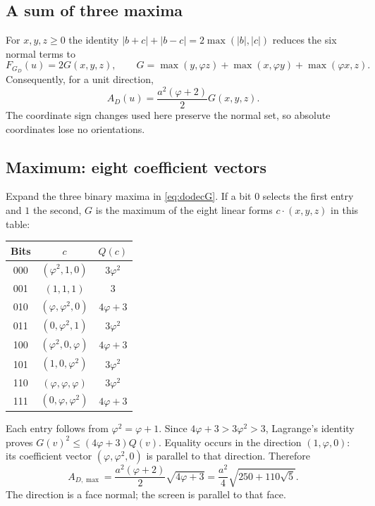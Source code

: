 \documentclass[11pt,a4paper]{article}
\newcommand{\ph}{\varphi}
\newcommand{\abs}[1]{\left|#1\right|}
\begin{document}
\subsection{A sum of three maxima}
For $x,y,z\ge0$ the identity $\abs{b+c}+\abs{b-c}=2\max(\abs b,\abs c)$ reduces the six normal terms to
\begin{equation}\label{eq:dodecG}
 F_{G_D}(u)=2G(x,y,z),\qquad
 G=\max(y,\ph z)+\max(x,\ph y)+\max(\ph x,z).
\end{equation}
Consequently, for a unit direction,
\begin{equation}\label{eq:dodecarea}
 A_D(u)=\frac{a^2(\ph+2)}2G(x,y,z).
\end{equation}
The coordinate sign changes used here preserve the normal set, so absolute coordinates lose no orientations.

\subsection{Maximum: eight coefficient vectors}
Expand the three binary maxima in \eqref{eq:dodecG}. If a bit $0$ selects the first entry and $1$ the second, $G$ is the maximum of the eight linear forms $c\cdot(x,y,z)$ in this table:
\begin{center}
\renewcommand{\arraystretch}{1.2}
\begin{tabular}{@{}ccc@{}}\toprule
Bits & $c$ & $Q(c)$\\\midrule
000&$(\ph^2,1,0)$&$3\ph^2$\\
001&$(1,1,1)$&$3$\\
010&$(\ph,\ph^2,0)$&$4\ph+3$\\
011&$(0,\ph^2,1)$&$3\ph^2$\\
100&$(\ph^2,0,\ph)$&$4\ph+3$\\
101&$(1,0,\ph^2)$&$3\ph^2$\\
110&$(\ph,\ph,\ph)$&$3\ph^2$\\
111&$(0,\ph,\ph^2)$&$4\ph+3$\\\bottomrule
\end{tabular}
\end{center}
Each entry follows from $\ph^2=\ph+1$. Since $4\ph+3>3\ph^2>3$, Lagrange's identity proves $G(v)^2\le(4\ph+3)Q(v)$. Equality occurs in the direction $(1,\ph,0)$: its coefficient vector $(\ph,\ph^2,0)$ is parallel to that direction. Therefore
\[
 A_{D,\max}=\frac{a^2(\ph+2)}2\sqrt{4\ph+3}
 =\frac{a^2}4\sqrt{250+110\sqrt5}.
\]
The direction is a face normal; the screen is parallel to that face.
\end{document}
